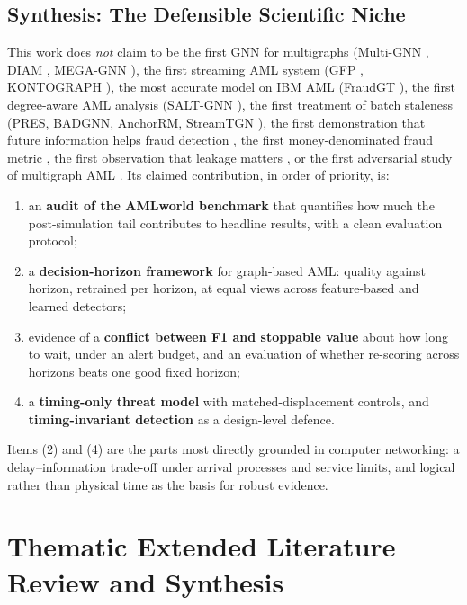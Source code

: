 \documentclass[11pt,a4paper]{article}
\begin{document}
\subsection{Synthesis: The Defensible Scientific Niche}
This work does \emph{not} claim to be the first GNN for multigraphs (Multi-GNN \cite{egressy2024multigraph}, DIAM \cite{ding2024diam}, MEGA-GNN \cite{bilgi2026mega}), the first streaming AML system (GFP \cite{blanusa2024gfp}, KONTOGRAPH \cite{abolfadl2026kontograph}), the most accurate model on IBM AML (FraudGT \cite{lin2024fraudgt}), the first degree-aware AML analysis (SALT-GNN \cite{losavio2026saltgnn}), the first treatment of batch staleness (PRES, BADGNN, AnchorRM, StreamTGN \cite{su2024pres,zhou2025badgnn,anchorrm2026,streamtgn2026}), the first demonstration that future information helps fraud detection \cite{nguyen2022future}, the first money-denominated fraud metric \cite{doytshman2023fraudability,shen2020dqn}, the first observation that leakage matters \cite{kaufman2012leakage,maganti2026liability}, or the first adversarial study of multigraph AML \cite{heijmans2026robust}. Its claimed contribution, in order of priority, is:
\begin{enumerate}[leftmargin=*]
    \item an \textbf{audit of the AMLworld benchmark} that quantifies how much the post-simulation tail contributes to headline results, with a clean evaluation protocol;
    \item a \textbf{decision-horizon framework} for graph-based AML: quality against horizon, retrained per horizon, at equal views across feature-based and learned detectors;
    \item evidence of a \textbf{conflict between F1 and stoppable value} about how long to wait, under an alert budget, and an evaluation of whether re-scoring across horizons beats one good fixed horizon;
    \item a \textbf{timing-only threat model} with matched-displacement controls, and \textbf{timing-invariant detection} as a design-level defence.
\end{enumerate}
Items (2) and (4) are the parts most directly grounded in computer networking: a delay--information trade-off under arrival processes and service limits, and logical rather than physical time as the basis for robust evidence.

\section{Thematic Extended Literature Review and Synthesis}
\label{sec:thematic_review}
\end{document}
